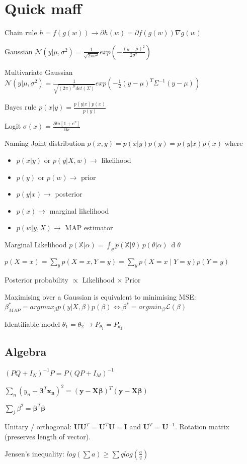 \section{Quick maff}
Chain rule $h = f(g(w)) \rightarrow \partial h(w) = \partial f(g(w)) \nabla g(w)$

Gaussian $\mathcal{N}(y|\mu, \sigma^2) = \frac{1}{\sqrt{2\pi \sigma^2}} exp(-\frac{(y-\mu)^2}{2\sigma^2})$

Multivariate Gaussian $\mathcal{N}(y|\mu, \sigma^2) = \frac{1}{\sqrt{(2\pi)^D det(\Sigma)}} exp(-\frac{1}{2} (y-\mu)^T \Sigma^{-1} (y-\mu))$

Bayes rule $p(x|y) = \frac{p(y|x) p(x)}{p(y)}$

Logit $\sigma(x) = \frac{\partial ln[1+e^x]}{\partial x}$

Naming
Joint distribution $p(x,y) = p(x|y)p(y) = p(y|x)p(x)$ where
\begin{itemize}
\item $p(x|y) \text{ or } p(y|X,w) \rightarrow$ likelihood 
\item $p(y)  \text{ or } p(w) \rightarrow$ prior
\item $p(y|x) \rightarrow$ posterior
\item $p(x) \rightarrow$ marginal likelihood
\item $p(w|y,X) \rightarrow$ MAP estimator 
\end{itemize}

Marginal Likelihood \newline $p({\mathbb  {X}}|\alpha )=\int _{\theta }p({\mathbb  {X}}|\theta )\,p(\theta |\alpha )\ \operatorname {d}\!\theta $

$p(X=x)=\sum_{y} p(X=x,Y=y) = \sum_{y} p(X=x \mid Y=y) p(Y=y)$

Posterior probability $\propto$ Likelihood $\times$ Prior

Maximising over a Gaussian is equivalent to minimising MSE: $\beta_{MAP}^* = arg max_{\beta} p(y|X,\beta)p(\beta) \Leftrightarrow \beta^* = arg min_{\beta} \mathcal{L}(\beta)$

Identifiable model \newline
$\theta_1 = \theta_2 \rightarrow P_{\theta_1} = P_{\theta_2}$

\subsection{Algebra}
$(PQ + I_N)^{-1} P = P (QP + I_M)^{-1}$

$\sum_n (y_{n} -\mathbf{\beta}^T\mathbf{x_n})^2 = (\mathbf{y} - \mathbf{X}\mathbf{\beta})^T(\mathbf{y} - \mathbf{X}\mathbf{\beta})$

$\sum_j \beta^2 = \mathbf{\beta}^T \mathbf{\beta}$

Unitary / orthogonal: $\mathbf{U}\mathbf{U}^T=\mathbf{U}^T\mathbf{U} = \mathbf{I}$ and $\mathbf{U}^T = \mathbf{U}^{-1}$. Rotation matrix (preserves length of vector).

Jensen's inequality: \newline $log(\sum a) \ge \sum q log(\frac{a}{q})$